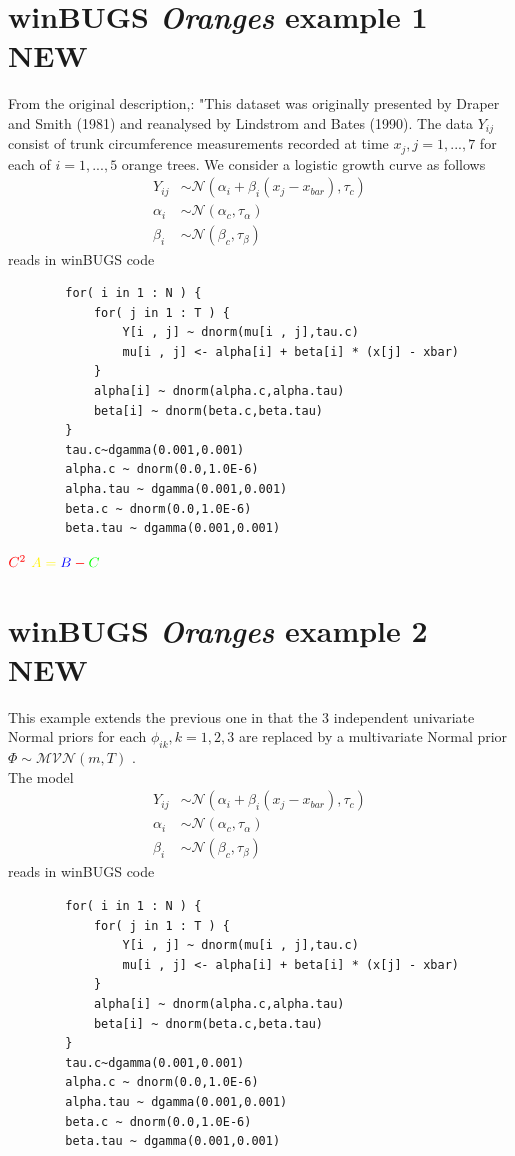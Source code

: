 \section{winBUGS \emph{Oranges} example 1 {\color{red} \scshape{NEW}}}
From the original description,\cite{winBUGSvol2}: 
"This dataset was originally presented by Draper and Smith (1981) and 
reanalysed by Lindstrom and Bates (1990). The data $Y_{ij}$ consist of trunk circumference 
measurements recorded at time $x_j, j=1,...,7$ for each of $i = 1,..., 5$ orange trees. 
We consider a logistic growth curve as follows
\begin{align*}
Y_{ij} &\sim \mathcal{N}(\alpha_i + \beta_i (x_j - x_{bar}), \tau_c) \\ 
\alpha_i &\sim \mathcal{N}(\alpha_c,\tau_{\alpha}) \\
\beta_i &\sim \mathcal{N}(\beta_c,\tau_{\beta}) 
\end{align*}
reads in winBUGS code
\lstset{language=MLX}
\begin{lstlisting}
		for( i in 1 : N ) {
			for( j in 1 : T ) {
				Y[i , j] ~ dnorm(mu[i , j],tau.c)
				mu[i , j] <- alpha[i] + beta[i] * (x[j] - xbar)
			}
			alpha[i] ~ dnorm(alpha.c,alpha.tau)
			beta[i] ~ dnorm(beta.c,beta.tau)
		} 
		tau.c~dgamma(0.001,0.001)
		alpha.c ~ dnorm(0.0,1.0E-6)
		alpha.tau ~ dgamma(0.001,0.001)
		beta.c ~ dnorm(0.0,1.0E-6)
		beta.tau ~ dgamma(0.001,0.001)
\end{lstlisting} 

$ \color{red} C^2 $
$ \color{yellow} A = \textcolor{blue}{B} \mathbin{\textcolor{red}{-}} \textcolor{green}{C} $


\section{winBUGS \emph{Oranges} example 2 {\color{red} \scshape{NEW}}}
This example extends the previous one in that the 3 independent univariate Normal 
priors for each $\phi_{ik}, k=1,2,3$ are replaced by a multivariate Normal 
prior $\Phi \sim \mathcal {MVN}(m, T)$ \cite{winBUGSvol2}.\\
The model
\begin{align*}
Y_{ij} &\sim \mathcal{N}(\alpha_i + \beta_i (x_j - x_{bar}), \tau_c) \\ 
\alpha_i &\sim \mathcal{N}(\alpha_c,\tau_{\alpha}) \\
\beta_i &\sim \mathcal{N}(\beta_c,\tau_{\beta}) 
\end{align*}
reads in winBUGS code
\lstset{language=MLX}
\begin{lstlisting}
		for( i in 1 : N ) {
			for( j in 1 : T ) {
				Y[i , j] ~ dnorm(mu[i , j],tau.c)
				mu[i , j] <- alpha[i] + beta[i] * (x[j] - xbar)
			}
			alpha[i] ~ dnorm(alpha.c,alpha.tau)
			beta[i] ~ dnorm(beta.c,beta.tau)
		} 
		tau.c~dgamma(0.001,0.001)
		alpha.c ~ dnorm(0.0,1.0E-6)
		alpha.tau ~ dgamma(0.001,0.001)
		beta.c ~ dnorm(0.0,1.0E-6)
		beta.tau ~ dgamma(0.001,0.001)
\end{lstlisting} 


